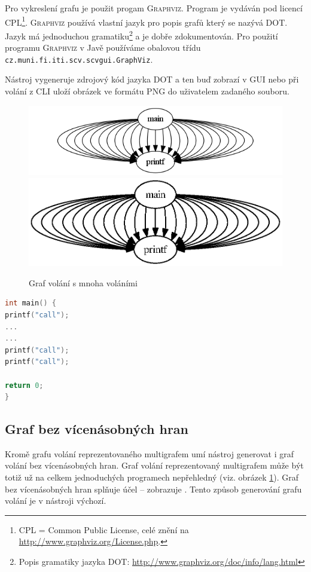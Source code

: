 \documentclass[11pt,final,oneside]{fithesis}
\begin{document}
Pro vykreslení grafu je použit progam \textsc{Graphviz}\cite{graphviz}. Program je vydáván pod licencí CPL\footnote{CPL = Common Public License, celé znění na \url{http://www.graphviz.org/License.php}.}. \textsc{Graphviz} používá vlastní jazyk pro popis grafů který se nazývá \textsc{DOT}. Jazyk má jednoduchou gramatiku\footnote{Popis gramatiky jazyka \textsc{DOT}: \url{http://www.graphviz.org/doc/info/lang.html}} a je dobře zdokumentován. Pro použití programu \textsc{Graphviz} v Javě používáme obalovou třídu \texttt{cz.muni.fi.iti.scv.scvgui.GraphViz}.

Nástroj vygeneruje zdrojový kód jazyka \textsc{DOT} a ten buď zobrazí v GUI nebo při volání z CLI uloží obrázek ve formátu \textsc{PNG} do uživatelem zadaného souboru.

\begin{figure}[ht]
\begin{center}
\ifpdf
	\includegraphics[scale=0.5]{img/many.png}
\else
	\includegraphics{img/many.ps}
\fi
\end{center}
\caption{Graf volání s mnoha voláními}
\label{many-img}
\end{figure}

\begin{lstlisting}[language=C,caption=Funkce s mnoha voláními,label=many-c]
int main() {
printf("call");
...
...
printf("call");
printf("call");

return 0;
}
\end{lstlisting}

\subsection{Graf bez vícenásobných hran}
Kromě grafu volání reprezentovaného multigrafem umí nástroj generovat i graf volání bez vícenásobných hran. Graf volání reprezentovaný multigrafem může být totiž už na celkem jednoduchých programech nepřehledný (viz. obrázek \ref{many-img}). Graf bez vícenásobných hran splňuje účel -- zobrazuje . Tento způsob generování grafu volání je v nástroji výchozí.
\end{document}
